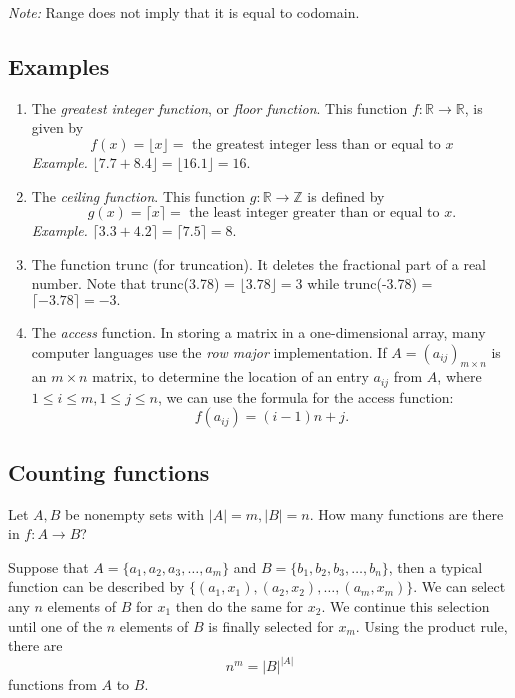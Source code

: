 \documentclass[11pt]{article}
\begin{document}
    \vspace{1em}

    \emph{Note:} Range does not imply that it is equal to codomain.

    \subsection{Examples}

    \begin{enumerate}
        \item The \emph{greatest integer function}, or \emph{floor function}. This function \(f: \mathbb{R \rightarrow \mathbb{R}}\), is given by \[f(x) = \lfloor x \rfloor = \text{ the greatest integer less than or equal to $x$}\] \emph{Example.} \(\lfloor 7.7 + 8.4 \rfloor = \lfloor 16.1 \rfloor = 16.\)
        \item The \emph{ceiling function}. This function \(g: \mathbb{R} \rightarrow \mathbb{Z}\) is defined by \[g(x) = \lceil x \rceil = \text{ the least integer greater than or equal to $x$.}\] \emph{Example.} \(\lceil 3.3 + 4.2 \rceil = \lceil 7.5 \rceil = 8.\)
        \item The function trunc (for truncation). It deletes the fractional part of a real number. Note that trunc(3.78) = \(\lfloor 3.78 \rfloor = 3\) while trunc(-3.78) = \(\lceil -3.78 \rceil = -3.\)
        \item The \emph{access} function. In storing a matrix in a one-dimensional array, many computer languages use the \emph{row major} implementation. If \(A = (a_{ij})_{m \times n}\) is an \(m \times n\) matrix, to determine the location of an entry \(a_{ij}\) from $A$, where \(1 \leq i \leq m, 1 \leq j \leq n\), we can use the formula for the access function: \[f(a_{ij}) = (i - 1)n + j.\]
    \end{enumerate}

    \subsection{Counting functions}

    Let \(A,B\) be nonempty sets with \(|A| = m, |B| = n.\) How many functions are there in \(f:A \rightarrow B\)?

    \vspace{1em}

    Suppose that \(A = \{a_1, a_2, a_3, \dots, a_m\}\) and \(B = \{b_1, b_2, b_3, \dots, b_n\}\), then a typical function can be described by \(\{(a_1, x_1), (a_2,x_2), \dots, (a_m, x_m)\}.\) We can select any $n$ elements of $B$ for \(x_1\) then do the same for \(x_2\). We continue this selection until one of the $n$ elements of $B$ is finally selected for \(x_m\). Using the product rule, there are \[n^m = |B|^{|A|}\] functions from $A$ to $B$.
\end{document}
